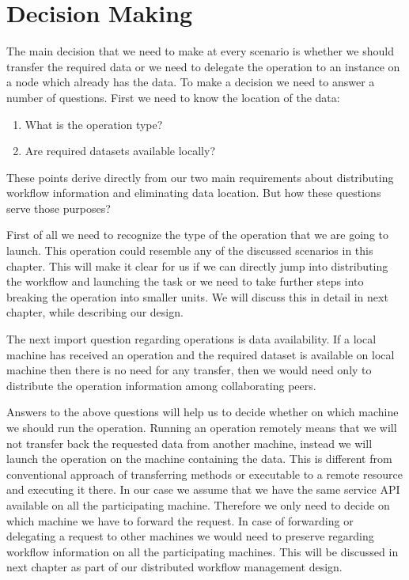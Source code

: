 \section{Decision Making}
The main decision that we need to make at every scenario is whether we should transfer the required data or we
need to delegate the operation to an instance on a node which already has the data. To make a decision we need to
answer a number of questions. First we need to know the location of the data:

\begin{enumerate}
\item What is the operation type?
\item Are required datasets available locally?
\end{enumerate}

These points derive directly from our two main requirements about distributing workflow information and 
eliminating data location. But how these questions serve those purposes?

First of all we need to recognize the type of the operation that we are going to launch. This operation could
resemble any of the discussed scenarios in this chapter. This will make it clear for us if we can directly
jump into distributing the workflow and launching the task or we need to take further steps into breaking
the operation into smaller units. We will discuss this in detail in next chapter, while describing our design.

The next import question regarding operations is data availability. If a local machine has received an operation
and the required dataset is available on local machine then there is no need for any transfer, then we would need
only to distribute the operation information among collaborating peers.

Answers to the above questions will help us to decide whether on which machine we should run the operation. Running an
operation remotely means that we will not transfer back the requested data from another machine, instead we will launch
the operation on the machine containing the data. This is different from conventional approach of transferring methods
or executable to a remote resource and executing it there. In our case we assume that we have the same service API 
available on all the participating machine. Therefore we only need to decide on which machine we have to forward
the request. In case of forwarding or delegating a request to other machines we would need to preserve regarding
workflow information on all the participating machines. This will be discussed in next chapter as part of our
distributed workflow management design.


